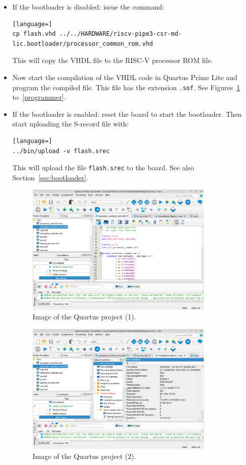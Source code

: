 \documentclass[12pt]{article}
\begin{document}
\begin{itemize}
\item If the bootloader is disabled: issue the command:
\begin{lstlisting}[language=]
cp flash.vhd ../../HARDWARE/riscv-pipe3-csr-md-lic.bootloader/processor_common_rom.vhd
\end{lstlisting}
This will copy the VHDL file to the RISC-V processor ROM file.
\item Now start the compilation of the VHDL code in Quartus Prime Lite and program the compiled file. This file has the extension \lstinline|.sof|. See Figures~\ref{quartus1} to~\ref{programmer}.
\item If the bootloader is enabled: reset the board to start the bootloader. Then start uploading the S-record file with:
\begin{lstlisting}[language=]
../bin/upload -v flash.srec
\end{lstlisting}
This will upload the file \lstinline|flash.srec| to the board. See also Section~\ref{sec:bootloader}.

\begin{figure}[!ht]
\centering
\includegraphics[width=0.85\textwidth]{quartus1}
\caption{Image of the Quartus project (1).}
\label{quartus1}
\end{figure}

\begin{figure}[!ht]
\centering
\includegraphics[width=0.85\textwidth]{quartus2}
\caption{Image of the Quartus project (2).}
\label{quartus2}
\end{figure}


\end{itemize}
\end{document}
